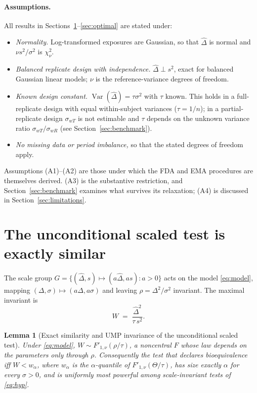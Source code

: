 \documentclass[11pt]{article}
\newtheorem{lemma}{Lemma}
\theoremstyle{remark}
\newcommand{\Dhat}{\hat{\Delta}}
\DeclareMathOperator{\Var}{Var}
\begin{document}
\paragraph{Assumptions.} All results in Sections~\ref{sec:invariance}--\ref{sec:optimal} are stated under:
\begin{itemize}
\item[\textbf{(A1)}] \emph{Normality.} Log-transformed exposures are Gaussian, so that $\Dhat$ is normal and $\nu s^2/\sigma^2$ is $\chi^2_\nu$.
\item[\textbf{(A2)}] \emph{Balanced replicate design with independence.} $\Dhat\perp s^2$, exact for balanced Gaussian linear models; $\nu$ is the reference-variance degrees of freedom.
\item[\textbf{(A3)}] \emph{Known design constant.} $\Var(\Dhat)=\tau\sigma^2$ with $\tau$ known. This holds in a full-replicate design with equal within-subject variances ($\tau=1/n$); in a partial-replicate design $\sigma_{wT}$ is not estimable and $\tau$ depends on the unknown variance ratio $\sigma_{wT}/\sigma_{wR}$ (see Section~\ref{sec:benchmark}).
\item[\textbf{(A4)}] \emph{No missing data or period imbalance,} so that the stated degrees of freedom apply.
\end{itemize}
Assumptions (A1)--(A2) are those under which the FDA and EMA procedures are themselves derived. (A3) is the substantive restriction, and Section~\ref{sec:benchmark} examines what survives its relaxation; (A4) is discussed in Section~\ref{sec:limitations}.

\section{The unconditional scaled test is exactly similar}\label{sec:invariance}

The scale group $G=\{(\Dhat,s)\mapsto(a\Dhat,as):a>0\}$ acts on the model \eqref{eq:model}, mapping $(\Delta,\sigma)\mapsto(a\Delta,a\sigma)$ and leaving $\rho=\Delta^2/\sigma^2$ invariant. The maximal invariant is
\begin{equation}
W \;=\; \frac{\Dhat^2}{\tau\,s^2}.
\end{equation}

\begin{lemma}[Exact similarity and UMP invariance of the unconditional scaled test]\label{lem:invariance}
Under \eqref{eq:model}, $W\sim F'_{1,\nu}(\rho/\tau)$, a noncentral $F$ whose law depends on the parameters only through $\rho$. Consequently the test that declares bioequivalence iff $W<w_\alpha$, where $w_\alpha$ is the $\alpha$-quantile of $F'_{1,\nu}(\Theta/\tau)$, has size exactly $\alpha$ for every $\sigma>0$, and is uniformly most powerful among scale-invariant tests of \eqref{eq:hyp}.
\end{lemma}
\end{document}
